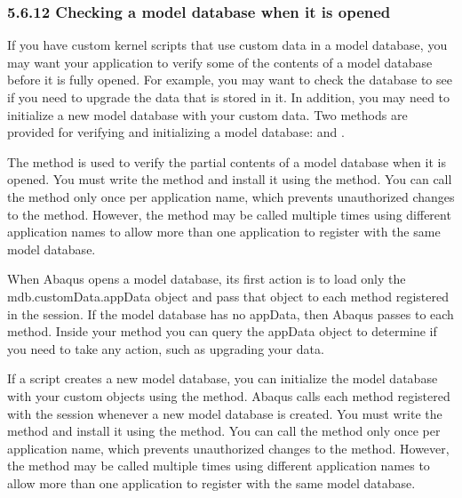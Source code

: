 \documentclass[letterpaper,10pt,english]{sphinxmanual}
\begin{document}
\subsubsection{5.6.12 Checking a model database when it is opened}
\label{\detokenize{abq_script_guide:checking-a-model-database-when-it-is-opened}}
If you have custom kernel scripts that use custom data in a model database, you may want your application to verify some of the contents of a model database before it is fully opened. For example, you may want to check the database to see if you need to upgrade the data that is stored in it. In addition, you may need to initialize a new model database with your custom data. Two methods are provided for verifying and initializing a model database:  and .


The  method is used to verify the partial contents of a model database when it is opened. You must write the  method and install it using the  method. You can call the  method only once per application name, which prevents unauthorized changes to the method. However, the  method may be called multiple times using different application names to allow more than one application to register with the same model database.

When Abaqus opens a model database, its first action is to load only the mdb.customData.appData object and pass that object to each  method registered in the session. If the model database has no appData, then Abaqus passes  to each  method. Inside your  method you can query the appData object to determine if you need to take any action, such as upgrading your data.


If a script creates a new model database, you can initialize the model database with your custom objects using the  method. Abaqus calls each  method registered with the session whenever a new model database is created. You must write the  method and install it using the  method. You can call the  method only once per application name, which prevents unauthorized changes to the method. However, the  method may be called multiple times using different application names to allow more than one application to register with the same model database.
\end{document}
